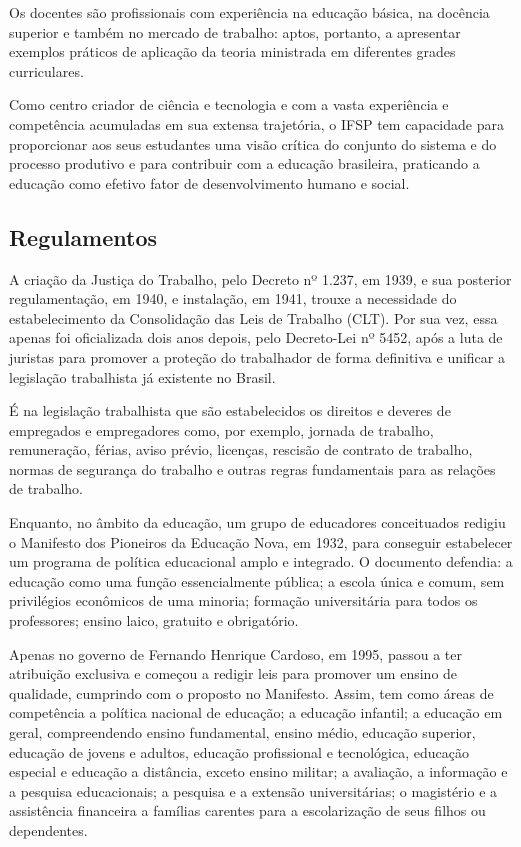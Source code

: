 \documentclass[12pt]{article}
\begin{document}
\par Os docentes são profissionais com experiência na educação básica, na docência superior e também no mercado de trabalho: aptos, portanto, a apresentar exemplos práticos de aplicação da teoria ministrada em diferentes grades curriculares. \cite{IFSP_2022} 
\par Como centro criador de ciência e tecnologia e com a vasta experiência e competência acumuladas em sua extensa trajetória, o IFSP tem capacidade para proporcionar aos seus estudantes uma visão crítica do conjunto do sistema e do processo produtivo e para contribuir com a educação brasileira, praticando a educação como efetivo fator de desenvolvimento humano e social. \cite{CSPhist_2016} 
\subsection{Regulamentos}
\par A criação da Justiça do Trabalho, pelo Decreto nº 1.237, em 1939, e sua posterior regulamentação, em 1940, e instalação, em 1941, trouxe a necessidade do estabelecimento da Consolidação das Leis de Trabalho (CLT). Por sua vez, essa apenas foi oficializada dois anos depois, pelo Decreto-Lei nº 5452, após a luta de juristas para promover a proteção do trabalhador de forma definitiva e unificar a legislação trabalhista já existente no Brasil.
\par É na legislação trabalhista que são estabelecidos os direitos e deveres de empregados e empregadores como, por exemplo, jornada de trabalho, remuneração, férias, aviso prévio, licenças, rescisão de contrato de trabalho, normas de segurança do trabalho e outras regras fundamentais para as relações de trabalho. \cite{PDI}
\par Enquanto, no âmbito da educação, um grupo de educadores conceituados redigiu o Manifesto dos Pioneiros da Educação Nova, em 1932, para conseguir estabelecer um programa de política educacional amplo e integrado. O documento defendia: a educação como uma função essencialmente pública; a escola única e comum, sem privilégios econômicos de uma minoria; formação universitária para todos os professores; ensino laico, gratuito e obrigatório. \cite{mecinst}
\par Apenas no governo de Fernando Henrique Cardoso, em 1995, passou a ter atribuição exclusiva e começou a redigir leis para promover um ensino de qualidade, cumprindo com o proposto no Manifesto. Assim, tem como áreas de competência a política nacional de educação; a educação infantil; a educação em geral, compreendendo ensino fundamental, ensino médio, educação superior, educação de jovens e adultos, educação profissional e tecnológica, educação especial e educação a distância, exceto ensino militar; a avaliação, a informação e a pesquisa educacionais; a pesquisa e a extensão universitárias; o magistério e a assistência financeira a famílias carentes para a escolarização de seus filhos ou dependentes. \cite{mecinst}
\end{document}
